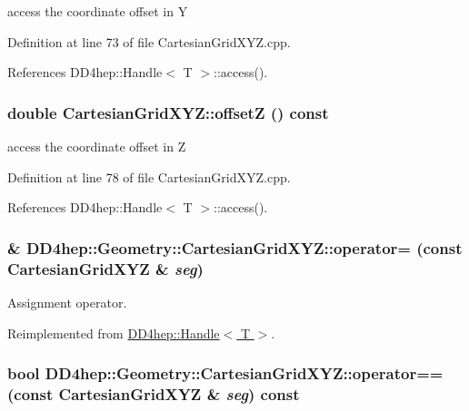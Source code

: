access the coordinate offset in Y 

Definition at line 73 of file CartesianGridXYZ.cpp.

References DD4hep::Handle$<$ T $>$::access().\hypertarget{class_d_d4hep_1_1_geometry_1_1_cartesian_grid_x_y_z_a239afa94d589bc37e84898375dc90638}{
\subsubsection[{offsetZ}]{\setlength{\rightskip}{0pt plus 5cm}double CartesianGridXYZ::offsetZ () const}}
\label{class_d_d4hep_1_1_geometry_1_1_cartesian_grid_x_y_z_a239afa94d589bc37e84898375dc90638}


access the coordinate offset in Z 

Definition at line 78 of file CartesianGridXYZ.cpp.

References DD4hep::Handle$<$ T $>$::access().\hypertarget{class_d_d4hep_1_1_geometry_1_1_cartesian_grid_x_y_z_aee2dbcb91803bc3d6ca773ae722ce716}{
\subsubsection[{operator=}]{\& DD4hep::Geometry::CartesianGridXYZ::operator= (const {\bf CartesianGridXYZ} \& {\em seg})}}
\label{class_d_d4hep_1_1_geometry_1_1_cartesian_grid_x_y_z_aee2dbcb91803bc3d6ca773ae722ce716}


Assignment operator. 

Reimplemented from \hyperlink{class_d_d4hep_1_1_handle_a9bbf8f498df42e81ad26fb00233505a6}{DD4hep::Handle$<$ T $>$}.\hypertarget{class_d_d4hep_1_1_geometry_1_1_cartesian_grid_x_y_z_a35dac1689f0207c26e105c88e4529c9f}{
\subsubsection[{operator==}]{\setlength{\rightskip}{0pt plus 5cm}bool DD4hep::Geometry::CartesianGridXYZ::operator== (const {\bf CartesianGridXYZ} \& {\em seg}) const}}
\label{class_d_d4hep_1_1_geometry_1_1_cartesian_grid_x_y_z_a35dac1689f0207c26e105c88e4529c9f}


